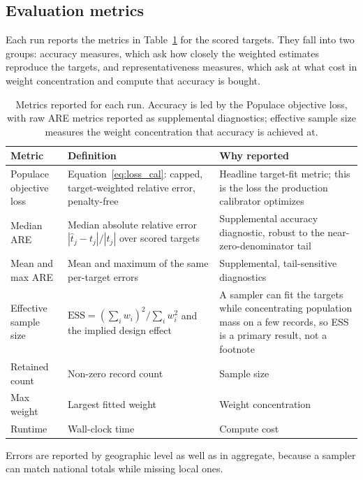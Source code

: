 \subsection{Evaluation metrics}
\label{sec:metrics}

Each run reports the metrics in Table~\ref{tab:metrics} for the scored targets. They fall into two
groups: accuracy measures, which ask how closely the weighted
estimates reproduce the targets, and representativeness measures, which ask at what cost in weight
concentration and compute that accuracy is bought.

\begin{table}[H]
\centering
{\tablefont
\begin{tabular}{p{}p{}p{}}
\toprule
Metric & Definition & Why reported \\
\midrule
Populace objective loss & Equation~\ref{eq:loss_cal}: capped, target-weighted relative error, penalty-free & Headline target-fit metric; this is the loss the production calibrator optimizes \\
Median ARE & Median absolute relative error $|\hat{t}_j - t_j| / |t_j|$ over scored targets & Supplemental accuracy diagnostic, robust to the near-zero-denominator tail \\
Mean and max ARE & Mean and maximum of the same per-target errors & Supplemental, tail-sensitive diagnostics \\
Effective sample size & $\mathrm{ESS} = (\sum_i w_i)^2 / \sum_i w_i^2$ and the implied design effect & A sampler can fit the targets while concentrating population mass on a few records, so ESS is a primary result, not a footnote \\
Retained count & Non-zero record count & Sample size \\
Max weight & Largest fitted weight & Weight concentration \\
Runtime & Wall-clock time & Compute cost \\
\bottomrule
\end{tabular}
}
\caption{Metrics reported for each run. Accuracy is led by the Populace objective loss, with raw ARE
metrics reported as supplemental diagnostics; effective sample size measures the weight concentration that
accuracy is achieved at.}
\label{tab:metrics}
\end{table}

Errors are reported by geographic level as well as in aggregate, because a sampler can match national
totals while missing local ones.

